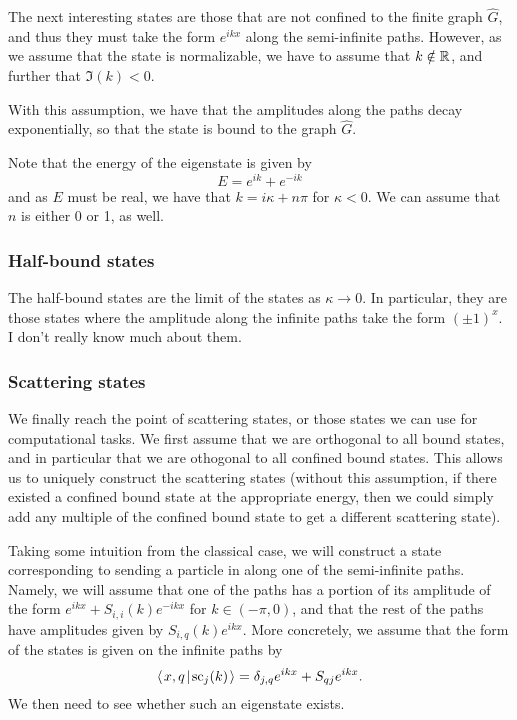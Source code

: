 \documentclass[../thesis-main/thesis-main]{subfiles}
\begin{document}
The next interesting states are those that are not confined to the finite graph $\widehat{G}$, and thus they must take the form $e^{i k x}$ along the semi-infinite paths.  However, as we assume that the state is normalizable, we have to assume that $k\notin \mathbb{R}$, and further that $\Im(k) < 0$.   

With this assumption, we have that the amplitudes along the paths decay exponentially, so that the state is bound to the graph $\widehat{G}$.  

Note that the energy of the eigenstate is given by 
\begin{equation}
  E = e^{i k } + e^{-i k}
\end{equation}
and as $E$ must be real, we have that $k = i \kappa + n\pi$ for $\kappa <0$.  We can assume that $n$ is either 0 or 1, as well.



\subsubsection{Half-bound states}

The half-bound states are the limit of the states as $\kappa \rightarrow 0$.  In particular, they are those states where the amplitude along the infinite paths take the form $(\pm 1)^x$.  I don't really know much about them.



\subsubsection{Scattering states}

We finally reach the point of scattering states, or those states we can use for computational tasks.  We first assume that we are orthogonal to all bound states, and in particular that we are othogonal to all confined bound states.  This allows us to uniquely construct the scattering states (without this assumption, if there existed a confined bound state at the appropriate energy, then we could simply add any multiple of the confined bound state to get a different scattering state).

Taking some intuition from the classical case, we will construct a state corresponding to sending a particle in along one of the semi-infinite paths.  Namely, we will assume that one of the paths has a portion of its amplitude of the form $e^{i k x} + S_{i,i}(k)e^{-i k x}$ for $k\in (-\pi, 0)$, and that the rest of the paths have amplitudes given by $S_{i,q}(k)e^{ikx}$.  More concretely, we assume that the form of the states is given on the infinite paths by
\begin{equation}
  \left\langle\mspace{2mu} x,q\mspace{2mu} \middle|\mspace{2mu} \text{sc}_{j}(k)\mspace{2mu} \right\rangle = \delta_{j,q} e^{i k x} + S_{qj} e^{i k x}.
\end{equation}
We then need to see whether such an eigenstate exists.
\end{document}

